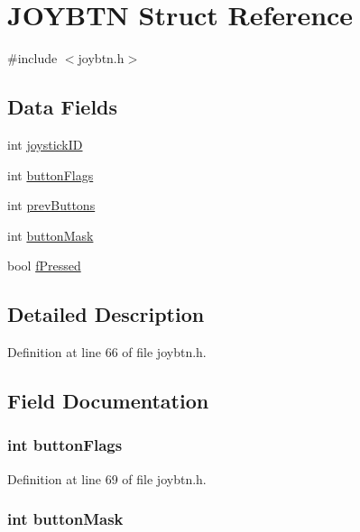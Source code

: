 \hypertarget{struct_j_o_y_b_t_n}{
\section{JOYBTN Struct Reference}
\label{struct_j_o_y_b_t_n}
}


{\ttfamily \#include $<$joybtn.h$>$}

\subsection*{Data Fields}
\begin{DoxyCompactItemize}
\item 
int \hyperlink{struct_j_o_y_b_t_n_aad862584085215cfd3bb4ae8f9bcc7d3}{joystickID}
\item 
int \hyperlink{struct_j_o_y_b_t_n_a6148b391ef961f67be939028d00f7609}{buttonFlags}
\item 
int \hyperlink{struct_j_o_y_b_t_n_af88233c2d18dce7e96045e08dc63841e}{prevButtons}
\item 
int \hyperlink{struct_j_o_y_b_t_n_a19c9b780ed67f8e97dd7110ec2860045}{buttonMask}
\item 
bool \hyperlink{struct_j_o_y_b_t_n_a2fd58fb5dcf1164c5225c2bf60d6440d}{fPressed}
\end{DoxyCompactItemize}


\subsection{Detailed Description}


Definition at line 66 of file joybtn.h.



\subsection{Field Documentation}
\hypertarget{struct_j_o_y_b_t_n_a6148b391ef961f67be939028d00f7609}{
\subsubsection[{buttonFlags}]{\setlength{\rightskip}{0pt plus 5cm}int {\bf buttonFlags}}}
\label{struct_j_o_y_b_t_n_a6148b391ef961f67be939028d00f7609}


Definition at line 69 of file joybtn.h.

\hypertarget{struct_j_o_y_b_t_n_a19c9b780ed67f8e97dd7110ec2860045}{
\subsubsection[{buttonMask}]{\setlength{\rightskip}{0pt plus 5cm}int {\bf buttonMask}}}
\label{struct_j_o_y_b_t_n_a19c9b780ed67f8e97dd7110ec2860045}


